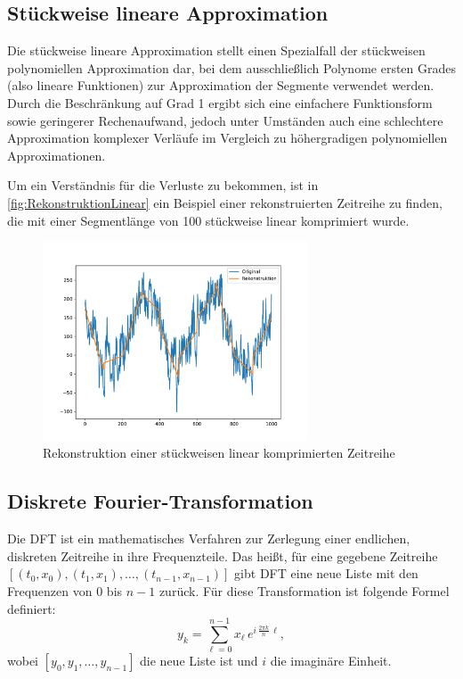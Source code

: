 \subsection{Stückweise lineare Approximation}
Die stückweise lineare Approximation stellt einen Spezialfall der stückweisen polynomiellen Approximation dar, bei dem ausschließlich Polynome ersten Grades (also lineare Funktionen) zur Approximation der Segmente verwendet werden.
Durch die Beschränkung auf Grad 1 ergibt sich eine einfachere Funktionsform sowie geringerer Rechenaufwand, jedoch unter Umständen auch eine schlechtere Approximation komplexer Verläufe im Vergleich zu höhergradigen polynomiellen Approximationen.

Um ein Verständnis für die Verluste zu bekommen, ist in \autoref{fig:RekonstruktionLinear} ein Beispiel einer rekonstruierten Zeitreihe zu finden, die mit einer Segmentlänge von 100 stückweise linear komprimiert wurde.
\begin{figure}[bth] 
  \centering
  \includegraphics[width=0.7\textwidth]{Graphics/RekonstruktionLinear.pdf}
  \caption{Rekonstruktion einer stückweisen linear komprimierten Zeitreihe}
  \label{fig:RekonstruktionLinear}
\end{figure}

\subsection{Diskrete Fourier-Transformation}
Die \ac{DFT} ist ein mathematisches Verfahren zur Zerlegung einer endlichen, diskreten Zeitreihe in ihre Frequenzteile. Das heißt, für eine gegebene Zeitreihe $[(t_0,x_0),(t_1,x_1),\ldots,(t_{n-1},x_{n-1})]$ gibt \acs{DFT} eine neue Liste mit den Frequenzen von 0 bis $n-1$ zurück. Für diese Transformation ist folgende Formel definiert:
\[y_k=\sum_{\ell=0}^{n-1}x_\ell\,e^{i\,\tfrac{2\pi k}{n}\,\ell},\]
wobei $[y_0,y_1,\ldots,y_{n-1}]$ die neue Liste ist und $i$ die imaginäre Einheit.

